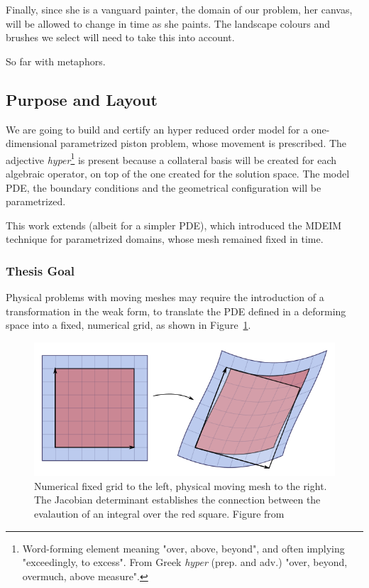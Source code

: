 \documentclass[thesis.tex]{subfiles}
\begin{document}
Finally, since she is a vanguard painter, the domain of our problem, her canvas, 
will be allowed to change in time as she paints.
The landscape colours and brushes we select will need to take this into account.

So far with metaphors.

\subsection{Purpose and Layout}
We are going to build and certify an
{hyper reduced order model} 
for a one-dimensional parametrized piston problem, 
whose movement is prescribed.
The adjective \mbox{\textit{hyper}}\footnote{
    Word-forming element meaning "over, above, beyond", 
    and often implying "exceedingly, to excess".
    From Greek \textit{hyper} (prep. and adv.) 
    "over, beyond, overmuch, above measure".
} is present because 
a collateral basis will be created for each algebraic operator,
on top of the one created for the solution space.
The model PDE, the boundary conditions and the geometrical configuration will be parametrized.

This work extends \cite{Santo_Manzoni_2019,2015_efficientModelReductionParametrizedSystemsMatrixDeim_Negri}
(albeit for a simpler PDE), 
which introduced the MDEIM technique for parametrized domains, whose mesh remained fixed in time.

\subsubsection{Thesis Goal}
Physical problems with moving meshes may require 
the introduction of a transformation in the weak form,
to translate the PDE defined in a deforming space into a fixed, 
numerical grid, as shown in Figure~\ref{fig:jacobianTransformation}.
\begin{figure}[h]
    \includegraphics[width=\columnwidth]{research_project/piston/figures/Jacobian_determinant_and_distortion.png}
    \caption{Numerical fixed grid to the left, physical moving mesh to the right.
    The Jacobian determinant establishes the connection between 
    the evalaution of an integral over the red square.
    Figure from \cite{jacobianTransformation}}
    \label{fig:jacobianTransformation}
\end{figure}
\end{document}
